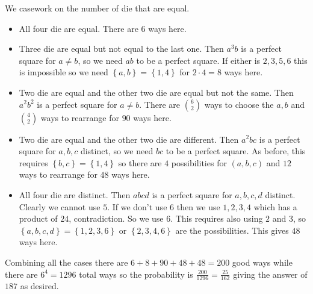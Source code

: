 We casework on the number of die that are equal.
\begin{itemize}
	\item All four die are equal. There are $6$ ways here.
	\item Three die are equal but not equal to the last one. Then $a^3b$ is a perfect square for $a\neq b$, so we need $ab$ to be a perfect square. If either is $2,3,5,6$ this is impossible so we need $\left\{a,b\right\}=\left\{1,4\right\}$ for $2\cdot4=8$ ways here.
	\item Two die are equal and the other two die are equal but not the same. Then $a^2b^2$ is a perfect square for $a\neq b$. There are $\binom{6}{2}$ ways to choose the $a,b$ and $\binom{4}{2}$ ways to rearrange for $90$ ways here.
	\item Two die are equal and the other two die are different. Then $a^2bc$ is a perfect square for $a,b,c$ distinct, so we need $bc$ to be a perfect square. As before, this requires $\left\{b,c\right\}=\left\{1,4\right\}$ so there are $4$ possibilities for $\left(a,b,c\right)$ and $12$ ways to rearrange for $48$ ways here.
	\item All four die are distinct. Then $abcd$ is a perfect square for $a,b,c,d$ distinct. Clearly we cannot use $5$. If we don't use $6$ then we use $1,2,3,4$ which has a product of $24$, contradiction. So we use $6$. This requires also using $2$ and $3$, so $\left\{a,b,c,d\right\}=\left\{1,2,3,6\right\}$ or $\left\{2,3,4,6\right\}$ are the possibilities. This gives $48$ ways here.
\end{itemize}
Combining all the cases there are $6+8+90+48+48=200$ good ways while there are $6^4=1296$ total ways so the probability is $\frac{200}{1296}=\frac{25}{162}$ giving the answer of $\boxed{187}$ as desired.